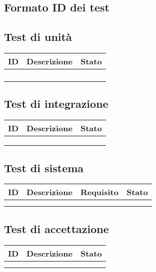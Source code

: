 \documentclass[10pt, a4paper]{article}
\begin{document}
\subsection{Formato ID dei test}
\subsection{Test di unità}
    {\renewcommand{\arraystretch}{1.5}
    \begin{tabularx}{\textwidth}{p{}|p{}|X}
    \textbf{ID} & \textbf{Descrizione} & \textbf{Stato}  \\
    \hline
     &  & \\
    \hline
     &  &  \\
    \hline
     &  & \\
    \hline
     &  &  \\
    \end{tabularx}}
    
\subsection{Test di integrazione}
    {\renewcommand{\arraystretch}{1.5}
    \begin{tabularx}{\textwidth}{p{}|p{}|X}
    \textbf{ID} & \textbf{Descrizione} & \textbf{Stato}  \\
    \hline
     &  & \\
    \hline
     &  &  \\
    \hline
     &  & \\
    \end{tabularx}}

\subsection{Test di sistema}
    {\renewcommand{\arraystretch}{1.5}
    \begin{tabularx}{\textwidth}{p{}|p{}|p{}|X}
    \textbf{ID} & \textbf{Descrizione} & \textbf{Requisito} & \textbf{Stato}  \\
    \hline
     &  & \\
    \hline
     &  &  \\
    \end{tabularx}}

\subsection{Test di accettazione}
    {\renewcommand{\arraystretch}{1.5}
    \begin{tabularx}{\textwidth}{p{}|p{}|X}
    \textbf{ID} & \textbf{Descrizione} & \textbf{Stato}  \\
    \hline
     &  & \\
    \hline
     &  &  \\
    \end{tabularx}}
    
\end{document}

